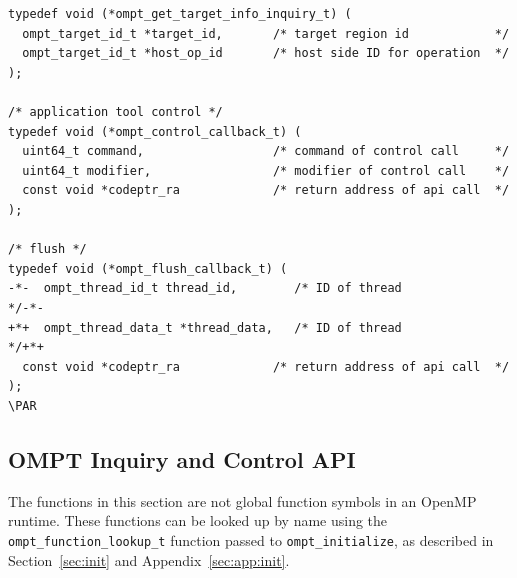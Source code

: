 \documentclass{article}
\begin{document}
\begin{lstlisting}
typedef void (*ompt_get_target_info_inquiry_t) (
  ompt_target_id_t *target_id,       /* target region id            */
  ompt_target_id_t *host_op_id       /* host side ID for operation  */
);

/* application tool control */
typedef void (*ompt_control_callback_t) (
  uint64_t command,                  /* command of control call     */
  uint64_t modifier,                 /* modifier of control call    */
  const void *codeptr_ra             /* return address of api call  */
);

/* flush */
typedef void (*ompt_flush_callback_t) (
-*-  ompt_thread_id_t thread_id,        /* ID of thread                */-*-
+*+  ompt_thread_data_t *thread_data,   /* ID of thread                */+*+
  const void *codeptr_ra             /* return address of api call  */
);
\PAR\end{lstlisting} 


\clearpage
\subsection{OMPT Inquiry and Control API}

The functions in this section are not global function symbols in an OpenMP runtime. These functions can be looked up by name using the \lstinline|ompt_function_lookup_t| function passed to \lstinline|ompt_initialize|, as described in Section~\ref{sec:init} and Appendix~\ref{sec:app:init}.
\end{document}
